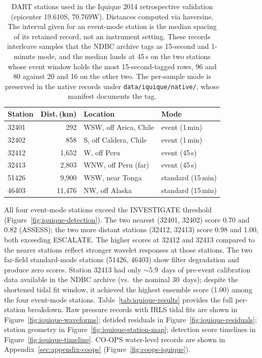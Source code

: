 \documentclass{article}
\begin{document}
\begin{table}[!htb]
\centering
\caption{DART stations used in the Iquique 2014 retrospective validation
  (epicenter 19.610\textdegree{}S, 70.769\textdegree{}W).
  Distances computed via haversine. The interval given for an
  event-mode station is the median spacing of its retained record, not
  an instrument setting. These records interleave samples that the
  NDBC archive tags as 15-second and 1-minute mode, and the median
  lands at 45\,s on the two stations whose event window holds the most
  15-second-tagged rows, 96 and 80 against 20 and 16 on the other two. The
  per-sample mode is preserved in the native records under
  \texttt{data/iquique/native/}, whose manifest documents the tag.}
\label{tab:iquique-stations}
\small
\begin{tabular}{lrll}
\toprule
\textbf{Station} & \textbf{Dist.\,(km)} & \textbf{Location} & \textbf{Mode} \\
\midrule
32401 &    292  & WSW, off Arica, Chile   & event (1\,min) \\
32402 &    858  & S, off Caldera, Chile   & event (1\,min) \\
32412 & 1{,}652 & W, off Peru            & event (45\,s) \\
32413 & 2{,}803 & WNW, off Peru (far)      & event (45\,s) \\
51426 & 9{,}900 & WSW, near Tonga           & standard (15\,min) \\
46403 & 11{,}476 & NW, off Alaska        & standard (15\,min) \\
\bottomrule
\end{tabular}
\end{table}

All four event-mode stations exceed the INVESTIGATE threshold
(Figure~\ref{fig:iquique-detection}).
The two nearest (32401, 32402) score 0.70 and 0.82 (ASSESS);
the two more distant stations (32412, 32413) score 0.98 and 1.00,
both exceeding ESCALATE.  The higher scores at 32412 and 32413
compared to the nearer stations reflect stronger wavelet responses
at those stations. The two far-field standard-mode stations
(51426, 46403) show filter degradation and produce zero scores.
Station 32413 had only ${\sim}5.9$~days of pre-event calibration data
available in the NDBC archive (vs.\ the nominal 30~days); despite the
shortened tidal fit window, it achieved the highest ensemble score
(1.00) among the four event-mode stations.
Table~\ref{tab:iquique-results} provides the full per-station breakdown.
Raw pressure records with IRLS tidal fits are shown in
Figure~\ref{fig:iquique-waveforms}; detided residuals in
Figure~\ref{fig:iquique-residuals}; station geometry in
Figure~\ref{fig:iquique-station-map}; detection score timelines in
Figure~\ref{fig:iquique-timeline}.
CO-OPS water-level records are shown in
Appendix~\ref{sec:appendix-coops} (Figure~\ref{fig:coops-iquique}).
\end{document}
